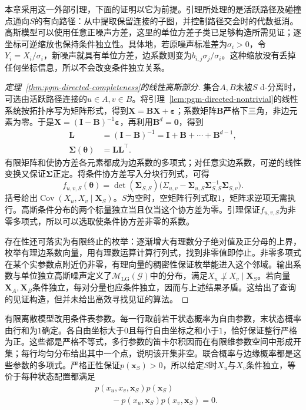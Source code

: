本章采用这一外部引理，下面的证明以它为前提。引理所处理的是活跃路径及碰撞点通向$S$的有向路径：从中提取保留连接的子图，并控制路径交会时的代数抵消。高斯模型可以使用任意正噪声方差，这里的单位方差子类已足够构造所需见证；逐坐标可逆缩放也保持条件独立性。具体地，若原噪声标准差为$\sigma_i>0$，令$Y_i=X_i/\sigma_i$，新噪声就具有单位方差，边系数则变为$b_{i,j}\sigma_j/\sigma_i$。这种缩放没有丢掉任何坐标信息，所以不会改变条件独立关系。

\begin{proof}[定理~\ref{thm:pgm-directed-completeness}的线性高斯部分]
集合$A,B$未被$S$ d-分离时，可选由活跃路径连接的$u\in A,v\in B$。将引理~\ref{lem:pgm-directed-nontrivial}的线性系统按拓扑序写为矩阵形式，得到$\bm X=\bm B\bm X+\bm\varepsilon$；系数矩阵$\bm{B}$严格下三角，非边元素为零。于是$\bm X=(\bm I-\bm B)^{-1}\bm\varepsilon$，再利用$\bm{B}^d=\bm 0$，得到
\[
  \begin{aligned}
    \bm{L}&=(\bm{I}-\bm{B})^{-1}
       =\bm{I}+\bm{B}+\cdots+\bm{B}^{d-1},\\
    \bm{\Sigma}(\bm{\theta})&=\bm{L}\bm{L}^{\top}.
  \end{aligned}
\]
有限矩阵和使协方差各元素都成为边系数的多项式；对任意实边系数，可逆的线性变换又保证$\bm{\Sigma}$正定。将条件协方差写入分块行列式，可得
\[
  f_{u,v,S}(\bm{\theta})
    =\det(\bm{\Sigma}_{S,S})
      \bigl(\Sigma_{u,v}
        -\bm{\Sigma}_{u,S}\bm{\Sigma}_{S,S}^{-1}
         \bm{\Sigma}_{S,v}\bigr).
\]
括号给出$\operatorname{Cov}(X_u,X_v\mid\bm X_S)$。$S$为空时，空矩阵行列式取$1$，矩阵求逆项无需执行。高斯条件分布的两个标量独立当且仅当这个协方差为零。引理保证$f_{u,v,S}$为非零多项式，所以可以选取使条件协方差非零的系数。

存在性还可落实为有限终止的枚举：逐渐增大有理数分子绝对值及正分母的上界，枚举有理边系数向量，用有理数运算计算行列式，找到非零值即停止。非零多项式在某个实参数点附近仍非零，有理向量的稠密性保证枚举能进入这个邻域。输出系数与单位独立高斯噪声定义了$\mathcal{M}_{\mathrm{LG}}(\mathcal{G})$中的分布，满足$X_u\not\perp X_v\mid\bm X_S$。若向量$\bm X_A,\bm X_B$条件独立，每对分量也应条件独立，因而与上述结果矛盾。这给出了查询的见证构造，但并未给出高效寻找见证的算法。
\end{proof}

有限离散模型改用条件表参数。每一行取前若干状态概率为自由参数，末状态概率由行和为$1$确定。各自由坐标大于$0$且每行自由坐标之和小于$1$，恰好保证整行严格为正。这些都是严格不等式，多行参数的笛卡尔积因而在有限维参数空间中形成开集；每行均匀分布给出其中一个点，说明该开集非空。联合概率与边缘概率都是这些参数的多项式。严格正性保证$p(\bm x_S)>0$，所以给定$S$时$X_u$与$X_v$条件独立，等价于每种状态配置都满足
\[
  \begin{aligned}
    &p(x_u,x_v,\bm x_S)p(\bm x_S)\\
    &\qquad{}-p(x_u,\bm x_S)p(x_v,\bm x_S)=0.
  \end{aligned}
\]

